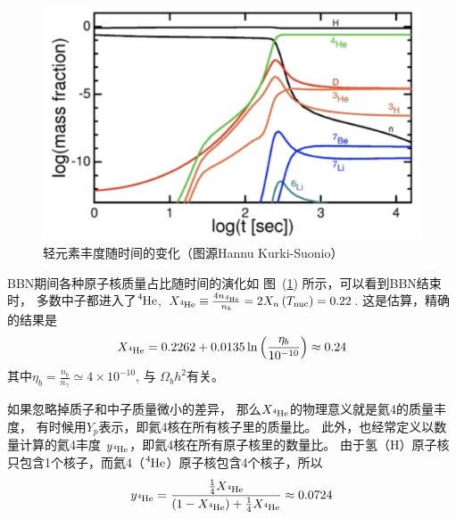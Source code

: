 \documentclass[]{ctexart}
\newcommand{\reffig}[1]{图~(\ref{#1})}
\begin{document}
\begin{figure}[!hbtp]
	\centering
	\includegraphics[width=1.0\linewidth]{BBNt.png}
	\caption{轻元素丰度随时间的变化（图源Hannu Kurki-Suonio）} \label{fig:BBNt}
\end{figure}

BBN期间各种原子核质量占比随时间的演化如 \reffig{fig:BBNt}   所示，可以看到BBN结束时，
多数中子都进入了$\ce{^{4}He} $, $X_{\ce{^{4}He} } \equiv \frac{4 n_{\ce{^{4}He} }}{n_b} = 2X_n\left(T_\text{nuc}\right) =0.22$.
这是估算，精确的结果是
\begin{equation}
    X_{\ce{^{4}He} } = 0.2262+0.0135 \ln \left( \frac{\eta_b}{10^{-10}}\right) \approx 0.24
\end{equation}
其中$\eta_b = \frac{n_b}{n_\gamma} \simeq 4\times 10^{-10}$, 与 $\Omega_b h^2$有关。

如果忽略掉质子和中子质量微小的差异，
那么$X_{\ce{^{4}He}}$的物理意义就是氦4的质量丰度，
有时候用$Y_p$表示，即氦4核在所有核子里的质量比。
此外，也经常定义以数量计算的氦4丰度 $y_{\ce{^{4}He}}$，即氦4核在所有原子核里的数量比。
由于氢（H）原子核只包含1个核子，而氦4（$\ce{^{4}He}$）原子核包含4个核子，所以\\
\begin{equation}
    y_{\ce{^{4}He}} = \frac{ \frac{1}{4} X_{\ce{^{4}He}}}{ (1- X_{\ce{^{4}He}}) +  \frac{1}{4} X_{\ce{^{4}He}} } \approx 0.0724
\end{equation}
\end{document}
